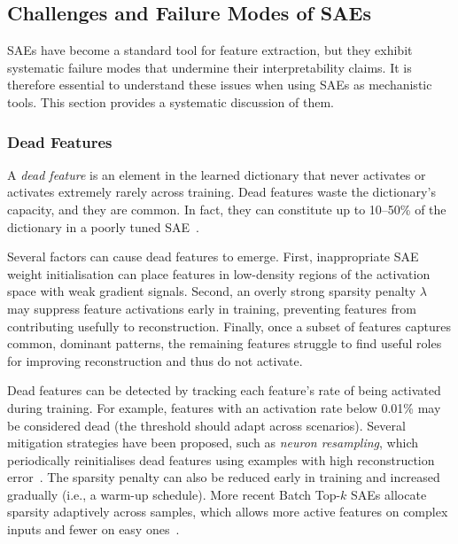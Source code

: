 \subsection{Challenges and Failure Modes of SAEs}
\label{subsec:challenge}

SAEs have become a standard tool for feature extraction, but they exhibit systematic failure modes that undermine their interpretability claims. It is therefore essential to understand these issues when using SAEs as mechanistic tools. This section provides a systematic discussion of them.

\subsubsection{Dead Features}
A \emph{dead feature} is an element in the learned dictionary that never activates or activates extremely rarely across training. Dead features waste the dictionary’s capacity, and they are common. In fact, they can constitute up to 10--50\% of the dictionary in a poorly tuned SAE~. 

Several factors can cause dead features to emerge. First, inappropriate SAE weight initialisation can place features in low-density regions of the activation space with weak gradient signals. Second, an overly strong sparsity penalty $\lambda$ may suppress feature activations early in training, preventing features from contributing usefully to reconstruction. Finally, once a subset of features captures common, dominant patterns, the remaining features struggle to find useful roles for improving reconstruction and thus do not activate.

Dead features can be detected by tracking each feature’s rate of being activated during training. For example, features with an activation rate below 0.01\% may be considered dead (the threshold should adapt across scenarios). Several mitigation strategies have been proposed, such as \emph{neuron resampling}, which periodically reinitialises dead features using examples with high reconstruction error~. The sparsity penalty can also be reduced early in training and increased gradually (i.e., a warm-up schedule). More recent Batch Top-$k$ SAEs allocate sparsity adaptively across samples, which allows more active features on complex inputs and fewer on easy ones~.

